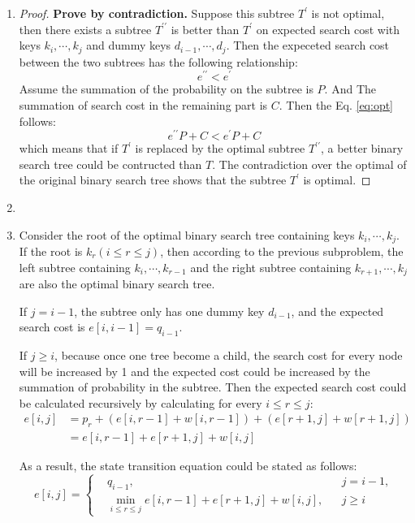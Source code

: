 \documentclass[12pt,a4paper]{article}
\makeatletter
\newtheorem*{solution}{Solution}
\theoremstyle{definition}
\renewenvironment{solution}[1][Solution] {\par\pushQED{\qed}\normalfont\topsep6\p@\@plus6\p@\relax\trivlist\item[\hskip\labelsep\bfseries#1\@addpunct{.}]\ignorespaces}{\popQED\endtrivlist\@endpefalse} \makeatother
\makeatother
\begin{document}
\begin{enumerate}
		\begin{enumerate}
			\item \begin{proof}
			\textbf{Prove by contradiction.} Suppose this subtree $T^\prime$ is not optimal, then there exists a subtree $T^{\prime\prime}$ is better than $T^\prime$ on expected search cost with keys $k_i,\cdots,k_j$ and dummy keys $d_{i-1},\cdots,d_j$. Then the expeceted search cost between the two subtrees has the following relationship:
			\begin{equation}\label{eq:opt}
				e^{\prime\prime}<e^\prime
			\end{equation}
			Assume the summation of the probability on the subtree is $P$. And The summation of search cost in the remaining part is $C$. Then the Eq. \eqref{eq:opt} follows:
			\begin{equation*}
				e^{\prime\prime}P+C<e^\prime P+C
			\end{equation*}
			which means that if $T^\prime$ is replaced by the optimal subtree $T^{\prime\prime}$, a better binary search tree could be contructed than $T$. The contradiction over the optimal of the original binary search tree shows that the subtree $T^\prime$ is optimal.
			\end{proof}
			\item \begin{solution} 
			
			Consider the root of the optimal binary search tree containing keys $k_i,\cdots,k_j$. If the root is $k_r(i\leq r\leq j)$, then according to the previous subproblem, the left subtree containing $k_i,\cdots,k_{r-1}$ and the right subtree containing $k_{r+1},\cdots, k_j$ are also the optimal binary search tree.

			If $j=i-1$, the subtree only has one dummy key $d_{i-1}$, and the expected search cost is $e[i,i-1]=q_{i-1}$.

			If $j\geq i$, because once one tree become a child, the search cost for every node will be increased by 1 and the expected cost could be increased by the summation of probability in the subtree. Then the expected search cost could be calculated recursively by calculating for every $i\leq r\leq j$:
			\begin{align*}
				e[i,j] &= p_r + (e[i,r-1]+w[i,r-1])+(e[r+1,j]+w[r+1,j])\\
				&=e[i,r-1]+e[r+1,j]+w[i,j]
			\end{align*}

			As a result, the state transition equation could be stated as follows:
			\begin{equation*}
				e[i,j]=\left\{\begin{aligned}
					&q_{i-1},&&j = i-1,\\
					&\min_{i\leq r\leq j} e[i,r-1]+e[r+1,j]+w[i,j],&&j\geq i
				\end{aligned}\right.
			\end{equation*}


\end{solution}
\end{enumerate}
\end{enumerate}
\end{document}
